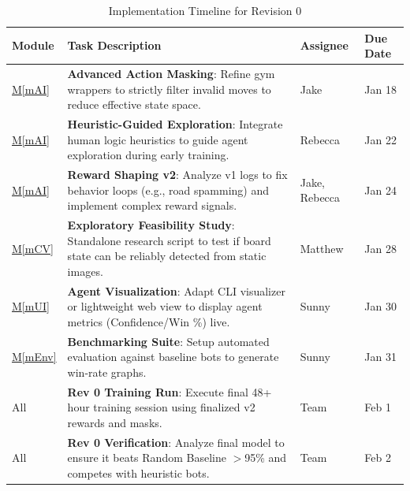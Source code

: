 \documentclass[12pt, titlepage]{article}
\newcommand{\mref}[1]{\hyperref[sec:#1]{M\ref*{#1}}}
\begin{document}
\begin{table}[H]
\centering
\caption{Implementation Timeline for Revision 0}
\label{TblTimeline}
\begin{tabularx}{\textwidth}{|l|X|l|l|}
\toprule
\textbf{Module} & \textbf{Task Description} & \textbf{Assignee} & \textbf{Due Date} \\
\midrule
\mref{mAI} & \textbf{Advanced Action Masking}: Refine gym wrappers to strictly filter invalid moves to reduce effective state space. & Jake & Jan 18 \\
\hline
\mref{mAI} & \textbf{Heuristic-Guided Exploration}: Integrate human logic heuristics to guide agent exploration during early training. & Rebecca & Jan 22 \\
\hline
\mref{mAI} & \textbf{Reward Shaping v2}: Analyze v1 logs to fix behavior loops (e.g., road spamming) and implement complex reward signals. & Jake, Rebecca & Jan 24 \\
\hline
\mref{mCV} & \textbf{Exploratory Feasibility Study}: Standalone research script to test if board state can be reliably detected from static images. & Matthew & Jan 28 \\
\hline
\mref{mUI} & \textbf{Agent Visualization}: Adapt CLI visualizer or lightweight web view to display agent metrics (Confidence/Win \%) live. & Sunny & Jan 30 \\
\hline
\mref{mEnv} & \textbf{Benchmarking Suite}: Setup automated evaluation against baseline bots to generate win-rate graphs. & Sunny & Jan 31 \\
\hline
All & \textbf{Rev 0 Training Run}: Execute final 48+ hour training session using finalized v2 rewards and masks. & Team & Feb 1 \\
\hline
All & \textbf{Rev 0 Verification}: Analyze final model to ensure it beats Random Baseline $>$95\% and competes with heuristic bots. & Team & Feb 2 \\
\bottomrule
\end{tabularx}
\end{table}





\newpage{}
\end{document}
